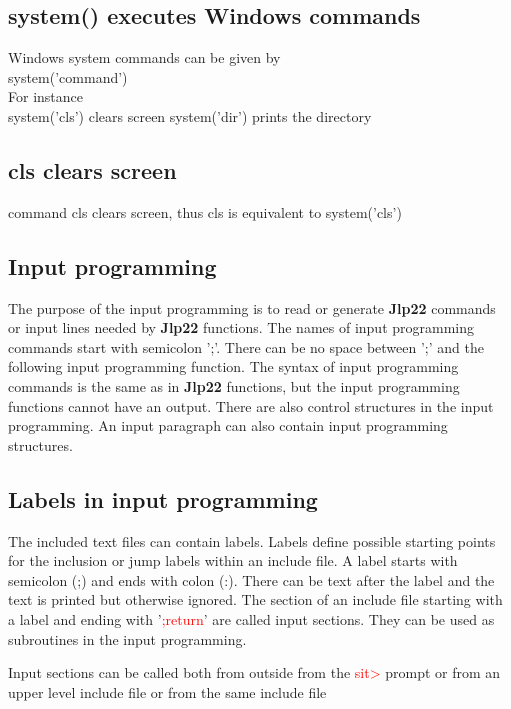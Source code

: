 \subsection{\textcolor{VioletRed}{system}() executes Windows commands} 
\label{systemcom} 
Windows system commands can be given by\\ 
\textcolor{VioletRed}{system}('command')\\ 
For instance \\ 
\textcolor{VioletRed}{system}('cls') clears screen 
\textcolor{VioletRed}{system}('dir') prints the directory 
\subsection{cls clears screen} 
\label{cls} 
command cls clears screen, thus cls is equivalent to \textcolor{VioletRed}{system}('cls') 
\subsection{Input programming} 
\label{inpuprog} 
The purpose of the input programming is to read or generate \textbf{Jlp22} commands or input lines 
needed by \textbf{Jlp22} functions. The names of input programming commands start with semicolon ';'. 
There can be no space between ';' and the following input programming function. The syntax 
of input programming commands is the same as in \textbf{Jlp22} functions, but the input programming 
functions cannot have an output. There are also control structures in the input programming. 
An input paragraph can also contain input programming structures. 
\subsection{ Labels in input programming} 
\label{inpuad} 
 
The included text files can contain labels. Labels define possible starting points for the 
inclusion or jump labels within an include file. A label starts with semicolon (;) and 
ends with colon (:). There can be text after the label and the text is printed but 
otherwise ignored. The section of an include file starting with a label and ending with '\textcolor{Red}{;return}' are 
called input sections. They can be used as subroutines in the input programming. 
 
\begin{note} 
Input sections can be called both from outside from the \textcolor{Red}{sit>} prompt or from an upper 
level include file or from the same include file 
\end{note} 
 
